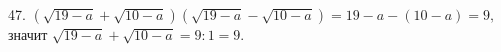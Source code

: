 47. $(\sqrt{19-a}+\sqrt{10-a})(\sqrt{19-a}-\sqrt{10-a})=19-a-(10-a)=9,$ значит $\sqrt{19-a}+\sqrt{10-a}=9:1=9.$\\
